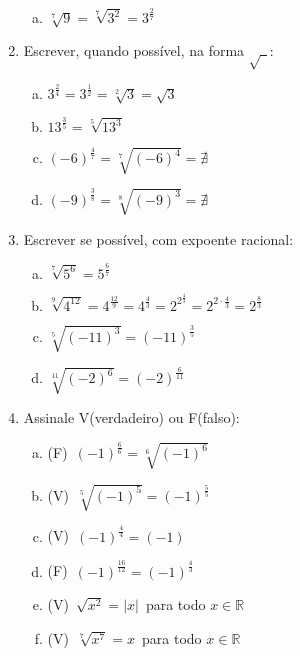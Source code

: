 \documentclass[a4paper,14pt]{article}
\begin{document}
\begin{multicols}{2}
\begin{enumerate}
\begin{enumerate}[a)]
        	\item $\sqrt[7]{9} = \sqrt[7]{3^2} = 3^\frac{2}{7}$ \\
        \end{enumerate}
        \item Escrever, quando possível, na forma $\sqrt{~~}$:
        \begin{enumerate}[a)] 
        	\item $3^\frac{2}{4} = 3^\frac{1}{2} = \sqrt[2]{3} = \sqrt{3}$\\
        	\item $13^\frac{3}{5} = \sqrt[5]{13^3}$ \\
        	\item $(-6)^\frac{4}{7} = \sqrt[7]{(-6)^4} = \nexists$ \\
        	\item $(-9)^\frac{3}{8} = \sqrt[8]{(-9)^3} = \nexists$ \\
        \end{enumerate}
        \item Escrever se possível, com expoente racional:
        \begin{enumerate}[a)]
        	\item $\sqrt[7]{5^6} = 5^\frac{6}{7}$ \\
        	\item $\sqrt[9]{4^{12}} = 4^\frac{12}{9} = 4^\frac{4}{3} = 2^{2^\frac{4}{3}} = 2^{2 \cdot \frac{4}{3}} = 2^\frac{8}{3}$ \\
        	\item $\sqrt[5]{(-11)^3} = (-11)^\frac{3}{5}$ \\
        	\item $\sqrt[11]{(-2)^6} = (-2)^\frac{6}{11}$ \\
        \end{enumerate}
        \item Assinale V(verdadeiro) ou F(falso):
        \begin{enumerate}[a)]
        	\item (F)~$(-1)^\frac{6}{6} = \sqrt[6]{(-1)^6}$ \\
        	\item (V)~$\sqrt[5]{(-1)^5} = (-1)^\frac{5}{5}$ \\
        	\item (V)~$(-1)^\frac{4}{4} = (-1)$ \\
        	\item (F)~$(-1)^\frac{16}{12} = (-1)^\frac{4}{3}$ \\
        	\item (V)~$\sqrt{x^2} = |x|$~para todo $x \in \mathbb{R}$ \\
        	\item (V)~$\sqrt[7]{x^7} = x$~para todo $x \in \mathbb{R}$ \\
        \end{enumerate}
    \end{enumerate}        
    \end{multicols}    
\end{document}

